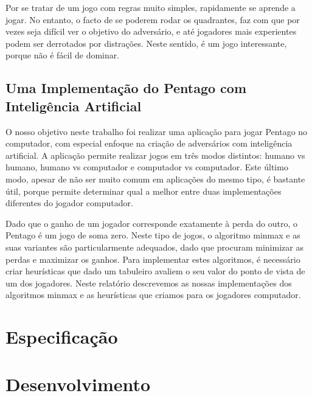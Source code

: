 Por se tratar de um jogo com regras muito simples, rapidamente se aprende a jogar. No entanto, o facto de se poderem rodar os quadrantes, faz com que por vezes seja difícil ver o objetivo do adversário, e até jogadores mais experientes podem ser derrotados por distrações. Neste sentido, é um jogo interessante, porque não é fácil de dominar.

\subsection{Uma Implementação do Pentago com Inteligência Artificial}

O nosso objetivo neste trabalho foi realizar uma aplicação para jogar Pentago no computador, com especial enfoque na criação de adversários com inteligência artificial. A aplicação permite realizar jogos em três modos distintos: humano vs humano, humano vs computador e computador vs computador. Este último modo, apesar de não ser muito comum em aplicações do mesmo tipo, é bastante útil, porque permite determinar qual a melhor entre duas implementações diferentes do jogador computador.

Dado que o ganho de um jogador corresponde exatamente à perda do outro, o Pentago é um jogo de soma zero. Neste tipo de jogos, o algoritmo minmax e as suas variantes são particularmente adequados, dado que procuram minimizar as perdas e maximizar os ganhos. Para implementar estes algoritmos, é necessário criar heurísticas que dado um tabuleiro avaliem o seu valor do ponto de vista de um dos jogadores. Neste relatório descrevemos as nossas implementações dos algoritmos minmax e as heurísticas que criamos para os jogadores computador. 

\newpage
\section{Especificação}







\newpage
\section{Desenvolvimento}



